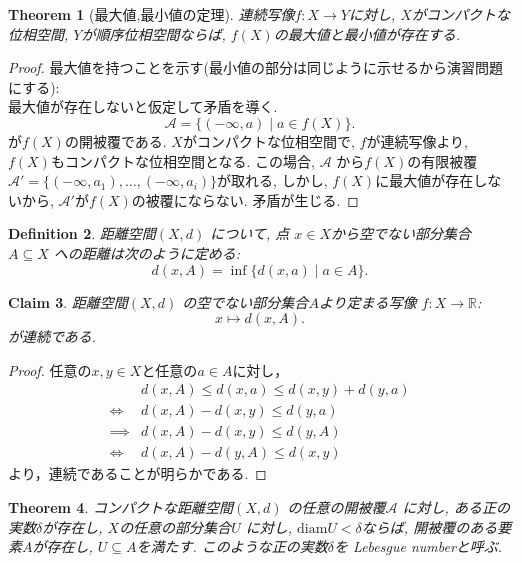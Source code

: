 \documentclass[dvipdfmx]{jbook}
\newtheorem{theorem}{Theorem}[section]
\newtheorem{definition}[theorem]{Definition}
\newtheorem{claim}[theorem]{Claim}
\theoremstyle{remark}
\theoremstyle{plain}
\begin{document}
\begin{theorem}[最大値,最小値の定理]
	連続写像$f : X \to Y$に対し, $X$がコンパクトな位相空間,  $Y$が順序位相空間ならば,  $f(X)$の最大値と最小値が存在する.
\end{theorem}

\begin{proof}
	最大値を持つことを示す(最小値の部分は同じように示せるから演習問題にする):\\
	最大値が存在しないと仮定して矛盾を導く. 
	\[
	\mathcal{A} = \{ (- \infty ,a )  \mid  a \in f(X)\} 
	.\] 
	が$f(X)$の開被覆である.  $X$がコンパクトな位相空間で,  $f$が連続写像より,  $f(X)$もコンパクトな位相空間となる.
	この場合,  $\mathcal{A}$ から$f(X)$の有限被覆$\mathcal{A}' = \{ (-\infty, a_1) , \ldots ,(-\infty,a_i)\} $が取れる, しかし,  $f(X)$に最大値が存在しないから,  $\mathcal{A}'$が$f(X)$の被覆にならない. 矛盾が生じる.

\end{proof}

\begin{definition}
	距離空間$\left( X ,d \right) $ について, 点 $x \in  X$から空でない部分集合 $  A \subseteq X$ への距離は次のように定める:
	\[
	d\left( x,A \right) = \inf  \{d\left( x,a \right)  \mid a \in A\} 
	.\] 
\end{definition}

\begin{claim}
	距離空間$\left( X ,d \right) $ の空でない部分集合$A$より定まる写像 $f: X \to \mathbb{R}$:
	\[
	x \mapsto d(x,A)
	.\] 
が連続である.
\end{claim}

\begin{proof}
	任意の$x,y \in X$と任意の$a \in A$に対し，
	\[
	\begin{aligned}
		& d\left( x,A \right)   \le d(x,a) \le d(x,y) + d(y,a)\\
		\iff &d(x,A) - d(x,y)  \le d(y,a) \\
		\implies &d(x,A) -d(x,y) \le d(y,A)\\
		\iff & d(x,A) -d(y,A) \le d(x,y)
	\end{aligned}
	\] 
	より，連続であることが明らかである.
\end{proof}


\begin{theorem}
	コンパクトな距離空間$\left( X,d \right) $ の任意の開被覆$\mathcal{A}$ に対し, 
	ある正の実数$\delta$が存在し, $X$の任意の部分集合$U$ に対し, $\mathrm{diam}U < \delta$ならば, 開被覆のある要素$A$が存在し, $U \subseteq A$を満たす.
	このような正の実数$\delta$を Lebesgue numberと呼ぶ.
\end{theorem}
\end{document}
